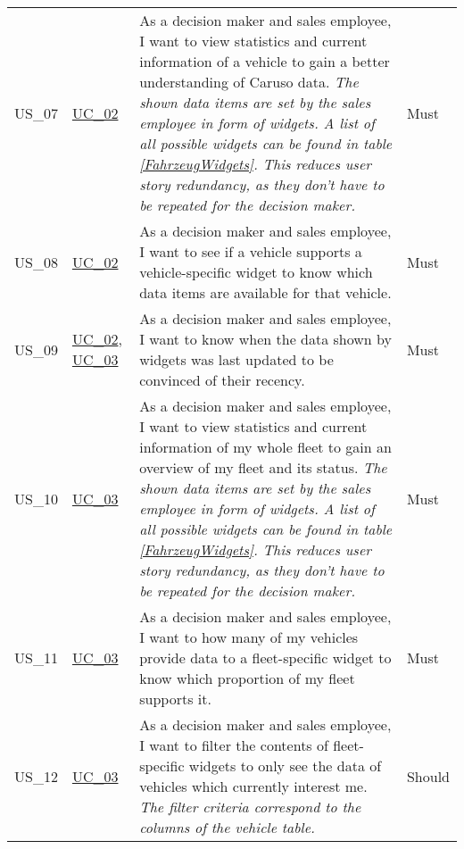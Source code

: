 \begin{footnotesize}
\begin{longtable}[L L L L]{ p{} p{} p{} p{}}
      \hypertarget{Ref:US7}{US\_07} & \hyperlink{Ref:UC2}{UC\_02} & As a decision maker and sales employee, I want to view statistics and current information of a vehicle to gain a better understanding of Caruso data. 
      \newline
      \emph{The shown data items are set by the sales employee in form of widgets. A list of all possible widgets can be found in table \ref{FahrzeugWidgets}. This reduces user story redundancy, as they don't have to be repeated for the decision maker.} & Must \\

      \hypertarget{Ref:US8}{US\_08} & \hyperlink{Ref:UC2}{UC\_02} & As a decision maker and sales employee, I want to see if a vehicle supports a vehicle-specific widget to know which data items are available for that vehicle. & Must
      \\

      \hypertarget{Ref:US9}{US\_09} & \hyperlink{Ref:UC2}{UC\_02}, \newline \hyperlink{Ref:UC3}{UC\_03} & As a decision maker and sales employee, I want to know when the data shown by widgets was last updated to be convinced of their recency. & Must
      \\

      \hypertarget{Ref:US10}{US\_10} & \hyperlink{Ref:UC3}{UC\_03} & As a decision maker and sales employee, I want to view statistics and current information of my whole fleet to gain an overview of my fleet and its status.
      \newline
      \emph{The shown data items are set by the sales employee in form of widgets. A list of all possible widgets can be found in table \ref{FahrzeugWidgets}. This reduces user story redundancy, as they don't have to be repeated for the decision maker.} & Must \\

      \hypertarget{Ref:US11}{US\_11} & \hyperlink{Ref:UC3}{UC\_03} & As a decision maker and sales employee, I want to how many of my vehicles provide data to a fleet-specific widget to know which proportion of my fleet supports it. & Must \\

      \hypertarget{Ref:US12}{US\_12} & \hyperlink{Ref:UC3}{UC\_03} & As a decision maker and sales employee, I want to filter the contents of fleet-specific widgets to only see the data of vehicles which currently interest me.
      \newline
      \emph{The filter criteria correspond to the columns of the vehicle table.}
      & Should \\

      \bottomrule
    \end{longtable}
  \end{footnotesize}
  \rmfamily

